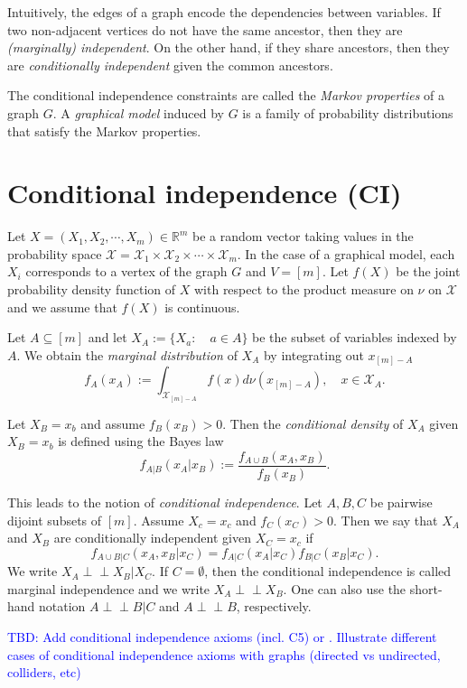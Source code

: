 \documentclass[10pt,a4paper]{article}
\newcommand{\indep}{\perp \!\!\! \perp}
\begin{document}
Intuitively, the edges of a graph encode the dependencies between variables. If two non-adjacent vertices do not have the same ancestor, then they are \emph{(marginally) independent}. On the other hand, if they share  ancestors, then they are \emph{conditionally independent} given the common ancestors. 

The conditional independence constraints are called the \emph{Markov properties} of a graph $G$. A \emph{graphical model} induced by $G$ is a family of probability distributions that satisfy the Markov properties.

\section{Conditional independence (CI)}\label{sec: CI}
Let $X=(X_1,X_2,\cdots,X_m)\in \mathbb{R}^m$ be a random vector taking values in the probability space $\mathcal{X}=\mathcal{X}_1\times\mathcal{X}_2\times\cdots\times\mathcal{X}_m$. In the case of a graphical model, each $X_i$ corresponds to a vertex of the graph $G$ and $V=[m]$. Let $f(X)$ be the joint probability density function of $X$ with respect to the product measure on $\nu$ on $\mathcal{X}$ and we assume that $f(X)$ is continuous.  

Let $A \subseteq [m]$ and let $X_A:=\{X_a:\quad a \in A\}$ be the subset of variables indexed by $A$. We obtain the \emph{marginal distribution} of $X_A$ by integrating out $x_{[m]-A}$
\[f_A(x_A):=\int_{\mathcal{X}_{[m]-A}} f(x)d\nu(x_{[m]-A}),\quad x \in \mathcal{X}_A.\]

Let $X_B=x_b$ and assume $f_B(x_B)>0$. Then the \emph{conditional density} of $X_A$ given $X_B=x_b$ is defined using the Bayes law
\[f_{A|B}(x_A|x_B):=\frac{f_{A\cup B}(x_A,x_B)}{f_B(x_B)}.\]

This leads to the notion of \emph{conditional independence}. Let $A,B,C$ be pairwise dijoint subsets of $[m]$. Assume $X_c=x_c$ and $f_C(x_C)>0$. Then we say that $X_A$ and $X_B$ are conditionally independent given $X_C=x_c$ if
\[f_{A\cup B|C}(x_A,x_B|x_C)=f_{A|C}(x_A|x_C)f_{B|C}(x_B|x_C).\]
We write $X_A\indep X_B|X_C$. If $C=\emptyset$, then the conditional independence is called marginal independence and we write $X_A\indep X_B$. One can also use the short-hand notation $A \indep B |C$ and $A \indep B$, respectively.

\textcolor{blue}{TBD: Add conditional independence axioms (incl. C5) \cite[p. 29]{lauritzen1996graphical}  or \cite[Proposition 3.1.2 and Proposition 3.1.3]{drton2008lectures}. Illustrate  different cases of conditional independence axioms with graphs (directed vs undirected, colliders, etc)} 
\end{document}
